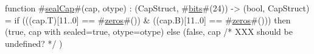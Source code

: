 function #\hyperref[zsealCap]{sealCap}#(cap, otype) : (CapStruct, #\hyperref[zbits]{bits}#(24)) -> (bool, CapStruct) =
    if (((cap.T)[11..0] == #\hyperref[zzzeros]{zeros}#()) & ((cap.B)[11..0] == #\hyperref[zzzeros]{zeros}#())) then
        (true, {cap with sealed=true, otype=otype})
    else
        (false, cap /* XXX should be undefined? */ )
